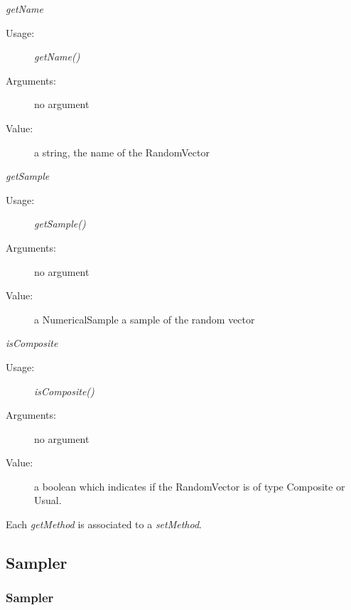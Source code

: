 \begin{description}
\begin{description}
\item \textit{getName}
\begin{description}
\item[Usage:] \textit{getName()}
\item[Arguments:] no argument
\item[Value:] a string, the name of the RandomVector
\end{description}
\bigskip

\item \textit{getSample}
\begin{description}
\item[Usage:] \textit{getSample()}
\item[Arguments:] no argument
\item[Value:] a NumericalSample
a sample of the random vector
\end{description}
\bigskip

\item \textit{isComposite}
\begin{description}
\item[Usage:] \textit{isComposite()}
\item[Arguments:] no argument
\item[Value:] a boolean which indicates if the RandomVector is of type Composite or Usual.
\end{description}
\end{description}

\end{description}

Each  \textit{getMethod}  is associated to a \textit{setMethod}.


\newpage
\subsection{Sampler}

\subsubsection{Sampler}

